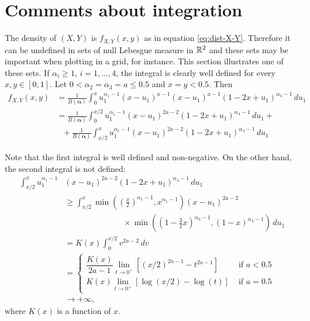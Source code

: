 \section{Comments about integration}

The density of $(X,Y)$ is $f_{X,Y}(x,y)$ as in equation \eqref{eq:dist-X-Y}. Therefore it can be undefined in sets of null Lebesgue measure in $\mathbb{R}^2$ and these sets may be important when plotting in a grid, for instance. This section illustrates one of these sets. If $\alpha_i \ge 1,
\, i = 1,...,4$, the integral is clearly well defined for every $x,y \in [0,1]$. Let $0 < \alpha_2 = \alpha_3 = a \le 0.5$ and $x = y < 0.5$. Then
\begin{equation*}
  \begin{split}
    f_{X,Y}(x,y) &= \frac{1}{B(\boldsymbol{\alpha})}\int_{0}^x u_1^{\alpha_1-1}(x-u_1)^{a-1}(x-u_1)^{a-1}(1-2x+u_1)^{\alpha_4-1} \, du_1 \\
    &= \frac{1}{B(\boldsymbol{\alpha})}\int_{0}^{x/2} u_1^{\alpha_1-1}(x-u_1)^{2a-2}(1-2x+u_1)^{\alpha_4-1} \, du_1 + \\
    &~~~+ \frac{1}{B(\boldsymbol{\alpha})}\int_{x/2}^x u_1^{\alpha_1-1}(x-u_1)^{2a-2}(1-2x+u_1)^{\alpha_4-1} \, du_1
  \end{split}
\end{equation*}

Note that the first integral is well defined and non-negative. On the other hand, the second integral is not defined: 
\begin{equation*}
  \begin{split}
    \int_{x/2}^{x} u_1^{\alpha_1-1}&(x-u_1)^{2a-2}(1-2x+u_1)^{\alpha_4-1} \, du_1 \\
    &\ge \int_{x/2}^x \min\left(\left(\frac{x}{2}\right)^{\alpha_1-1}, x^{\alpha_1-1}\right)(x-u_1)^{2a-2} \\ 
    &\hspace{3cm} \times \min\left(\left(1-\frac{3}{2}x\right)^{\alpha_4-1}, (1-x)^{\alpha_4-1}\right) \, du_1 \\
    &= K(x) \int_{0}^{x/2} v^{2a-2} \, dv \\ 
    &= \begin{cases}
      \dfrac{K(x)}{2a-1} \lim_{t \to 0^+} \left[(x/2)^{2a-1} - t^{2a-1}\right] &\text{ if } a < 0.5 \\ 
      K(x) \lim_{t \to 0^+} \left[\log(x/2) - \log(t)\right] &\text{ if } a = 0.5
    \end{cases} \\
    &\to +\infty, 
  \end{split}
\end{equation*}
where $K(x)$ is a function of $x$. 

